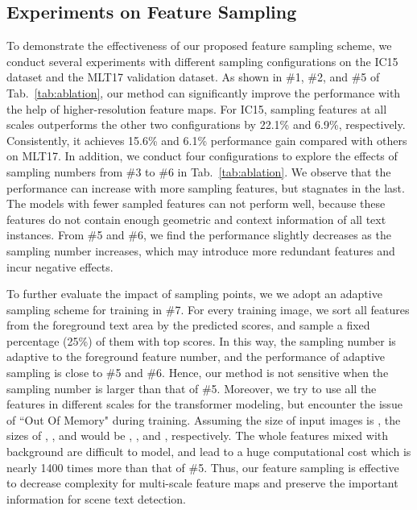 \documentclass[10pt,twocolumn,letterpaper]{article}
\begin{document}
\subsection{Experiments on Feature Sampling}
To demonstrate the effectiveness of our proposed feature sampling scheme, we conduct several experiments with different sampling configurations on the IC15 dataset and the MLT17 validation dataset.
As shown in \#1, \#2, and \#5 of Tab.~\ref{tab:ablation}, our method can significantly improve the performance with the help of higher-resolution feature maps.
For IC15, sampling features at all scales outperforms the other two configurations by 22.1\% and 6.9\%, respectively.
Consistently, it achieves 15.6\% and 6.1\% performance gain compared with others on MLT17.
In addition, we conduct four configurations to explore the effects of sampling numbers from \#3 to \#6 in Tab.~\ref{tab:ablation}.
We observe that the performance can increase with more sampling features, but stagnates in the last.
The models with fewer sampled features can not perform well, because these features do not contain enough geometric and context information of all text instances.
From \#5 and \#6, we find the performance slightly decreases as the sampling number increases, which may introduce more redundant features and incur negative effects.

To further evaluate the impact of sampling points, we we adopt an adaptive sampling scheme for training in \#7.
For every training image, we sort all features from the foreground text area by the predicted scores, and sample a fixed percentage (25\%) of them with top scores.
In this way, the sampling number is adaptive to the foreground feature number, and the performance of adaptive sampling is close to \#5 and \#6. Hence, our method is not sensitive when the sampling number is larger than that of \#5.
Moreover, we try to use all the features in different scales for the transformer modeling, but encounter the issue of ``Out Of Memory" during training.
Assuming the size of input images is , the sizes of , , and  would be , , and , respectively.
The whole features mixed with background are difficult to model, and lead to a huge computational cost which is nearly 1400 times more than that of \#5.
Thus, our feature sampling is effective to decrease complexity for multi-scale feature maps and preserve the important information for scene text detection.
\end{document}
